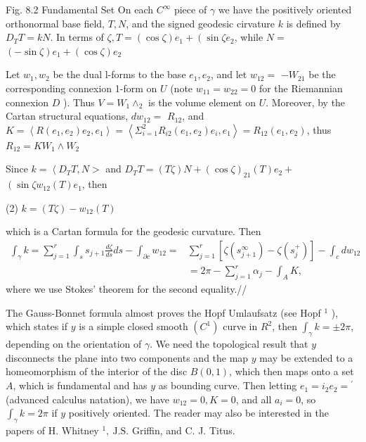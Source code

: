 \documentclass[10pt]{article}
\begin{document}
Fig. 8.2 Fundamental Set On each $C^{\infty}$ piece of $\gamma$ we have the positively oriented orthonormal base field, $T, N$, and the signed geodesic cirvature $k$ is defined by $D_{T} T=k N .$ In terms of $\zeta, T=(\cos \zeta) e_{1}+\left(\sin \zeta e_{2}\right.$, while $N=$ $(-\sin \zeta) e_{1}+(\cos \zeta) e_{2}$

Let $w_{1}, w_{2}$ be the dual l-forms to the base $e_{1}, e_{2}$, and let $w_{12}=$ $-W_{21}$ be the corresponding connexion 1-form on $U$ (note $w_{11}=w_{22}=0$ for the Riemannian connexion $D$ ). Thus $V=W_{1} \wedge_{2}$ is the volume element on $U$. Moreover, by the Cartan structural equations, $d w_{12}=$ $R_{12}$, and $K=\left\langle R\left(e_{1}, e_{2}\right) e_{2}, e_{1}\right\rangle=\left\langle\Sigma_{i=1}^{2} R{ }_{i 2}\left(e_{1}, e_{2}\right) e_{i}, e_{1}\right\rangle=R_{12}\left(e_{1}, e_{2}\right)$, thus $R_{12}=K W_{1} \wedge W_{2}$

Since $k=\left\langle D_{T} T, N>\right.$ and $D_{T} T=(T \zeta) N+(\cos \zeta)_{21}(T) e_{2}+$ $\left(\sin \zeta w_{12}(T) e_{1}\right.$, then

(2) $k=(T \zeta)-w_{12}(T)$

which is a Cartan formula for the geodesic curvature. Then
$$
\begin{aligned}
\int_{\gamma} k=\sum_{j=1}^{r} \int_{s} s_{j+1} \frac{d \zeta}{d s} d s-\int_{\partial c} w_{12}=& \sum_{j=1}^{r}\left[\zeta\left(s_{j+1}^{\infty}\right)-\zeta\left(s_{j}^{+}\right)\right]-\int_{c} d w_{12} \\
&=2 \pi-\sum_{j=1}^{r} \alpha_{j}-\int_{A} K,
\end{aligned}
$$
where we use Stokes' theorem for the second equality.//

The Gauss-Bonnet formula almost proves the Hopf Umlaufsatz (see Hopf ${ }^{1}$ ), which states if $y$ is a simple closed smooth $\left(C^{1}\right)$ curve in $R^{2}$, then $\int_{\gamma} k=\pm 2 \pi$, depending on the orientation of $\gamma$. We need the topological result that $y$ disconnects the plane into two components and the map $y$ may be extended to a homeomorphism of the interior of the disc $B(0,1)$, which then maps onto a set $A$, which is fundamental and has $y$ as bounding curve. Then letting $e_{1}=i_{2} e_{2}={ }^{\prime}$ (advanced calculus natation), we have $w_{12}=0, K=0$, and all $a_{i}=0$, so $\int_{\gamma} k=2 \pi$ if $y$ positively oriented. The reader may also be interested in the papers of $\mathrm{H}$. Whitney ${ }^{1}, \mathrm{~J} . \mathrm{S}$. Griffin, and $\mathrm{C}$. J. Titus.
\end{document}
